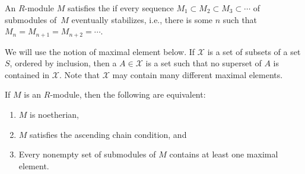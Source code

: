 \begin{definition}
	An $R$-module $M$ satisfies the  if
	every sequence $M_1\subset M_2 \subset M_3 \subset \cdots$ of
	submodules of~$M$ eventually stabilizes, i.e., there is some $n$ such
	that $M_n=M_{n+1}=M_{n+2}=\cdots$.
\end{definition}
We will use the notion of maximal element below.  If $\mathcal{X}$ is
a set of subsets of a set $S$, ordered by inclusion, then a
 $A\in \mathcal{X}$ is a set such that no superset
of $A$ is contained in $\mathcal{X}$.  Note that $\mathcal{X}$ may
contain many different maximal elements.

\begin{proposition}
	If $M$ is an $R$-module, then the following are equivalent:
	\begin{enumerate}
		\item $M$ is noetherian,
		\item $M$ satisfies the ascending chain condition, and
		\item Every nonempty set of submodules of $M$ contains at
		least one maximal element.
	\end{enumerate}
\end{proposition}
